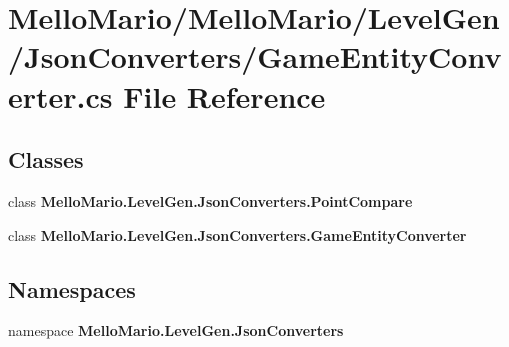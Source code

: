 \section{Mello\+Mario/\+Mello\+Mario/\+Level\+Gen/\+Json\+Converters/\+Game\+Entity\+Converter.cs File Reference}
\label{GameEntityConverter_8cs}
\subsection*{Classes}
\begin{DoxyCompactItemize}
\item 
class \textbf{ Mello\+Mario.\+Level\+Gen.\+Json\+Converters.\+Point\+Compare}
\item 
class \textbf{ Mello\+Mario.\+Level\+Gen.\+Json\+Converters.\+Game\+Entity\+Converter}
\end{DoxyCompactItemize}
\subsection*{Namespaces}
\begin{DoxyCompactItemize}
\item 
namespace \textbf{ Mello\+Mario.\+Level\+Gen.\+Json\+Converters}
\end{DoxyCompactItemize}
